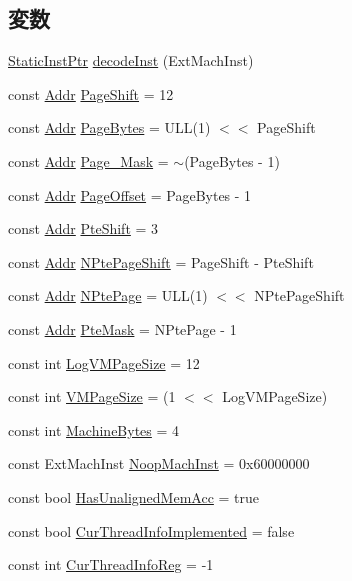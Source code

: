 \subsection*{変数}
\begin{DoxyCompactItemize}
\item 
\hyperlink{classRefCountingPtr}{StaticInstPtr} \hyperlink{namespacePowerISA_acff056b9dfcd05748ff37c6a69d9e854}{decodeInst} (ExtMachInst)
\item 
const \hyperlink{base_2types_8hh_af1bb03d6a4ee096394a6749f0a169232}{Addr} \hyperlink{namespacePowerISA_a6eacddc1d6d191380d9afdac5920ea48}{PageShift} = 12
\item 
const \hyperlink{base_2types_8hh_af1bb03d6a4ee096394a6749f0a169232}{Addr} \hyperlink{namespacePowerISA_ad9d6a4d965e107c9a7214f096107296b}{PageBytes} = ULL(1) $<$$<$ PageShift
\item 
const \hyperlink{base_2types_8hh_af1bb03d6a4ee096394a6749f0a169232}{Addr} \hyperlink{namespacePowerISA_ac2d47d845cf48dbc176f717bb7d50a7f}{Page\_\-Mask} = $\sim$(PageBytes -\/ 1)
\item 
const \hyperlink{base_2types_8hh_af1bb03d6a4ee096394a6749f0a169232}{Addr} \hyperlink{namespacePowerISA_a51e1064f1269394dc26702651be5061f}{PageOffset} = PageBytes -\/ 1
\item 
const \hyperlink{base_2types_8hh_af1bb03d6a4ee096394a6749f0a169232}{Addr} \hyperlink{namespacePowerISA_af2c06ba3a5eb15cdac25d21b735b7161}{PteShift} = 3
\item 
const \hyperlink{base_2types_8hh_af1bb03d6a4ee096394a6749f0a169232}{Addr} \hyperlink{namespacePowerISA_a9f060ccda225dfb28dff712695adab46}{NPtePageShift} = PageShift -\/ PteShift
\item 
const \hyperlink{base_2types_8hh_af1bb03d6a4ee096394a6749f0a169232}{Addr} \hyperlink{namespacePowerISA_ae295358052b4e754e08cd5cd763c212a}{NPtePage} = ULL(1) $<$$<$ NPtePageShift
\item 
const \hyperlink{base_2types_8hh_af1bb03d6a4ee096394a6749f0a169232}{Addr} \hyperlink{namespacePowerISA_a11ac2316fa90081132b648e36e4dd11b}{PteMask} = NPtePage -\/ 1
\item 
const int \hyperlink{namespacePowerISA_a554fef169d109a5ccb7ce0dd6a43e521}{LogVMPageSize} = 12
\item 
const int \hyperlink{namespacePowerISA_a891eaf95159d764e6efae501c2860a3a}{VMPageSize} = (1 $<$$<$ LogVMPageSize)
\item 
const int \hyperlink{namespacePowerISA_a8f4ba87c53caab23396d3b86b672b0fb}{MachineBytes} = 4
\item 
const ExtMachInst \hyperlink{namespacePowerISA_a8d1e39e0ea757dcc9725c6ccd81dd4c4}{NoopMachInst} = 0x60000000
\item 
const bool \hyperlink{namespacePowerISA_a1c3adbc67ce574fe545e332d3bc677be}{HasUnalignedMemAcc} = true
\item 
const bool \hyperlink{namespacePowerISA_a9faf3aac879cfa867d4ae15d4119c45e}{CurThreadInfoImplemented} = false
\item 
const int \hyperlink{namespacePowerISA_a7e5bf2f33f34327efc1eeccbb0c1141f}{CurThreadInfoReg} = -\/1
\end{DoxyCompactItemize}


